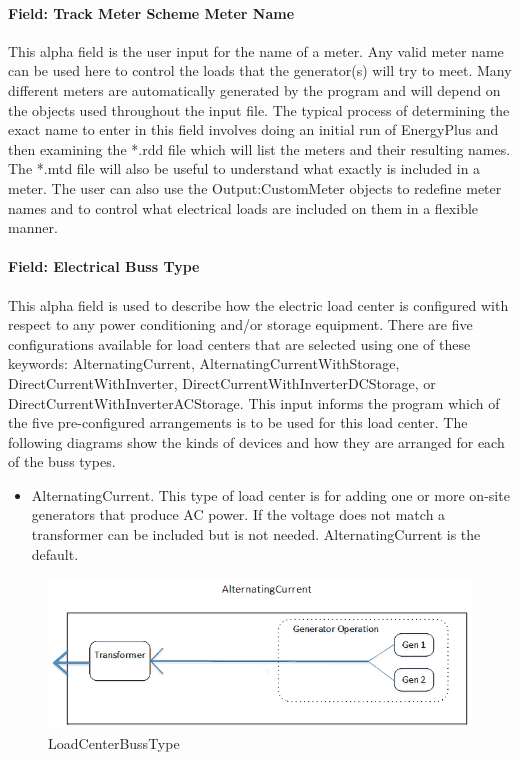 \paragraph{Field: Track Meter Scheme Meter Name}\label{field-track-meter-scheme-meter-name}

This alpha field is the user input for the name of a meter. Any valid meter name can be used here to control the loads that the generator(s) will try to meet. Many different meters are automatically generated by the program and will depend on the objects used throughout the input file. The typical process of determining the exact name to enter in this field involves doing an initial run of EnergyPlus and then examining the *.rdd file which will list the meters and their resulting names. The *.mtd file will also be useful to understand what exactly is included in a meter. The user can also use the Output:CustomMeter objects to redefine meter names and to control what electrical loads are included on them in a flexible manner.

\paragraph{Field: Electrical Buss Type}\label{field-electrical-buss-type}

This alpha field is used to describe how the electric load center is configured with respect to any power conditioning and/or storage equipment. There are five configurations available for load centers that are selected using one of these keywords: AlternatingCurrent, AlternatingCurrentWithStorage, DirectCurrentWithInverter, DirectCurrentWithInverterDCStorage, or DirectCurrentWithInverterACStorage. This input informs the program which of the five pre-configured arrangements is to be used for this load center. The following diagrams show the kinds of devices and how they are arranged for each of the buss types.

\begin{itemize}
\tightlist
\item
  AlternatingCurrent. This type of load center is for adding one or more on-site generators that produce AC power. If the voltage does not match a transformer can be included but is not needed. AlternatingCurrent is the default.
\end{itemize}

\begin{figure}[htbp]
\centering
\includegraphics{media/ACBussDiagram.png}
\caption{LoadCenterBussType}
\end{figure}

